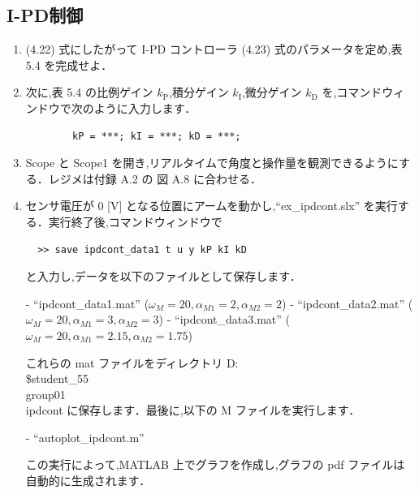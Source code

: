 \subsection{I-PD制御}

\begin{enumerate}
  \item (4.22) 式にしたがって I-PD コントローラ (4.23) 式のパラメータを定め,表 5.4 を完成せよ．
        
  \item 次に,表 5.4 の比例ゲイン $k_{\mathrm{P}}$,積分ゲイン $k_{\mathrm{I}}$,微分ゲイン $k_{\mathrm{D}}$ を,コマンドウィンドウで次のように入力します．
        \begin{verbatim}
        kP = ***; kI = ***; kD = ***;
        \end{verbatim}
        
  \item Scope と Scope1 を開き,リアルタイムで角度と操作量を観測できるようにする．レジメは付録 A.2 の 図 A.8 に合わせる．
        
  \item センサ電圧が 0 [V] となる位置にアームを動かし,“ex\_ipdcont.slx” を実行する．実行終了後,コマンドウィンドウで
        \begin{verbatim}
  >> save ipdcont_data1 t u y kP kI kD
  \end{verbatim}
        と入力し,データを以下のファイルとして保存します．
        
        - “ipdcont\_data1.mat” ($\omega_M = 20, \alpha_{M1} = 2, \alpha_{M2} = 2$)
        - “ipdcont\_data2.mat” ($\omega_M = 20, \alpha_{M1} = 3, \alpha_{M2} = 3$)
        - “ipdcont\_data3.mat” ($\omega_M = 20, \alpha_{M1} = 2.15, \alpha_{M2} = 1.75$)
        
        これらの mat ファイルをディレクトリ D:\\\$student\_55\\group01\\ipdcont に保存します．最後に,以下の M ファイルを実行します．
        
        - “autoplot\_ipdcont.m”
        
        この実行によって,MATLAB 上でグラフを作成し,グラフの pdf ファイルは自動的に生成されます．
\end{enumerate}

